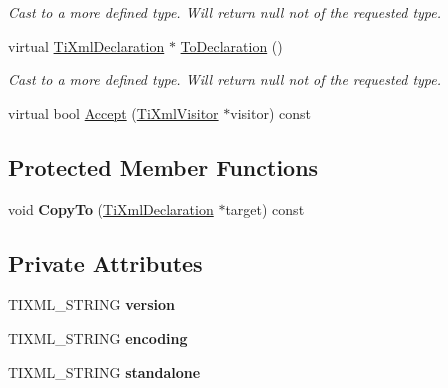 \begin{DoxyCompactItemize}
\begin{DoxyCompactList}\small\item\em \-Cast to a more defined type. \-Will return null not of the requested type. \end{DoxyCompactList}\item 
\hypertarget{class_ti_xml_declaration_a6bd3d1daddcaeb9543c24bfd090969ce}{virtual \hyperlink{class_ti_xml_declaration}{\-Ti\-Xml\-Declaration} $\ast$ \hyperlink{class_ti_xml_declaration_a6bd3d1daddcaeb9543c24bfd090969ce}{\-To\-Declaration} ()}\label{class_ti_xml_declaration_a6bd3d1daddcaeb9543c24bfd090969ce}

\begin{DoxyCompactList}\small\item\em \-Cast to a more defined type. \-Will return null not of the requested type. \end{DoxyCompactList}\item 
virtual bool \hyperlink{class_ti_xml_declaration_ab6a6b178161ba9abc2c35058de689864}{\-Accept} (\hyperlink{class_ti_xml_visitor}{\-Ti\-Xml\-Visitor} $\ast$visitor) const 
\end{DoxyCompactItemize}
\subsection*{\-Protected \-Member \-Functions}
\begin{DoxyCompactItemize}
\item 
\hypertarget{class_ti_xml_declaration_a9d08959f935421a593032bd3efb30c38}{void {\bfseries \-Copy\-To} (\hyperlink{class_ti_xml_declaration}{\-Ti\-Xml\-Declaration} $\ast$target) const }\label{class_ti_xml_declaration_a9d08959f935421a593032bd3efb30c38}

\end{DoxyCompactItemize}
\subsection*{\-Private \-Attributes}
\begin{DoxyCompactItemize}
\item 
\hypertarget{class_ti_xml_declaration_ab9eb14dc9cb78e3a8a0636d5d6a5d04d}{\-T\-I\-X\-M\-L\-\_\-\-S\-T\-R\-I\-N\-G {\bfseries version}}\label{class_ti_xml_declaration_ab9eb14dc9cb78e3a8a0636d5d6a5d04d}

\item 
\hypertarget{class_ti_xml_declaration_a24b8645d7696ec169bbb3fb7d30860cf}{\-T\-I\-X\-M\-L\-\_\-\-S\-T\-R\-I\-N\-G {\bfseries encoding}}\label{class_ti_xml_declaration_a24b8645d7696ec169bbb3fb7d30860cf}

\item 
\hypertarget{class_ti_xml_declaration_a52524bf1a0726104350fe4121d7fdff4}{\-T\-I\-X\-M\-L\-\_\-\-S\-T\-R\-I\-N\-G {\bfseries standalone}}\label{class_ti_xml_declaration_a52524bf1a0726104350fe4121d7fdff4}

\end{DoxyCompactItemize}


